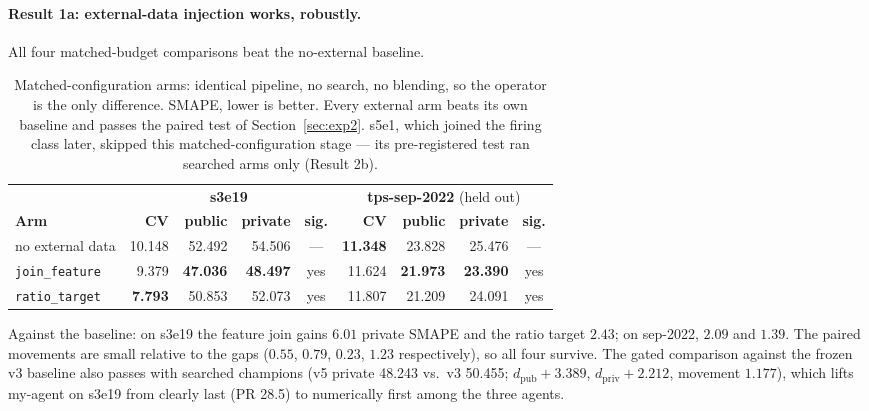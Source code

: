 \documentclass[11pt,a4paper]{article}
\begin{document}
\paragraph{Result 1a: external-data injection works, robustly.} All four matched-budget comparisons beat the no-external baseline.

\begin{table}[H]
\centering\small
\caption{Matched-configuration arms: identical pipeline, no search, no blending, so the operator is the only difference. SMAPE, lower is better. Every external arm beats its own baseline and passes the paired test of Section~\ref{sec:exp2}. s5e1, which joined the firing class later, skipped this matched-configuration stage --- its pre-registered test ran searched arms only (Result 2b).}
\label{tab:v5-2x2}
\setlength{\tabcolsep}{5pt}
\begin{tabular}{@{}lrrrcrrrc@{}}
\toprule
 & \multicolumn{4}{c}{\textbf{s3e19}} & \multicolumn{4}{c}{\textbf{tps-sep-2022} (held out)} \\
\cmidrule(lr){2-5}\cmidrule(lr){6-9}
\textbf{Arm} & \textbf{CV} & \textbf{public} & \textbf{private} & \textbf{sig.} & \textbf{CV} & \textbf{public} & \textbf{private} & \textbf{sig.} \\
\midrule
no external data & 10.148 & 52.492 & 54.506 & --- & \textbf{11.348} & 23.828 & 25.476 & --- \\
\texttt{join\_feature} & 9.379 & \textbf{47.036} & \textbf{48.497} & yes & 11.624 & \textbf{21.973} & \textbf{23.390} & yes \\
\texttt{ratio\_target} & \textbf{7.793} & 50.853 & 52.073 & yes & 11.807 & 21.209 & 24.091 & yes \\
\bottomrule
\end{tabular}
\end{table}

Against the baseline: on s3e19 the feature join gains $6.01$ private SMAPE and the ratio target $2.43$; on sep-2022, $2.09$ and $1.39$. The paired movements are small relative to the gaps ($0.55$, $0.79$, $0.23$, $1.23$ respectively), so all four survive. The gated comparison against the frozen v3 baseline also passes with searched champions (v5 private 48.243 vs.\ v3 50.455; $d_{\mathrm{pub}}{+}3.389$, $d_{\mathrm{priv}}{+}2.212$, movement $1.177$), which lifts my-agent on s3e19 from clearly last (PR 28.5) to numerically first among the three agents.
\end{document}

